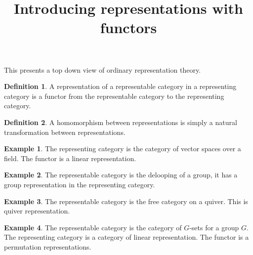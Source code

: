 \documentclass[10pt]{article}
\theoremstyle{plain}%
\theoremstyle{definition}
\newtheorem{definition}{Definition}[section]
\newtheorem{example}{Example}[section]
\theoremstyle{remark}
\begin{document}
\title{Introducing representations with functors}

\maketitle

This presents a top down view of ordinary representation theory.

\begin{definition}
	A representation of a representable category in a representing category is a functor from the representable category to the representing category.
\end{definition}

\begin{definition}
	A homomorphism between representations is simply a natural transformation between representations.
\end{definition}

\begin{example}
	The representing category is the category of vector spaces over a field. The functor is a linear representation.
\end{example}

\begin{example}
	The representable category is the delooping of a group, it has a group representation in the representing category.
\end{example}

\begin{example}
	The representable category is the free category on a quiver. This is quiver representation.
\end{example}

\begin{example}
	The representable category is the category of $G$-sets for a group $G$. The representing category is a category of linear representation. The functor is a permutation representations.	
\end{example}
\end{document}

